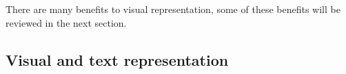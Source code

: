 

There are many benefits to visual representation, some of these benefits will be reviewed in the next section.
\subsection{Visual and text representation}\label{sec:visual_and_text_representation}








